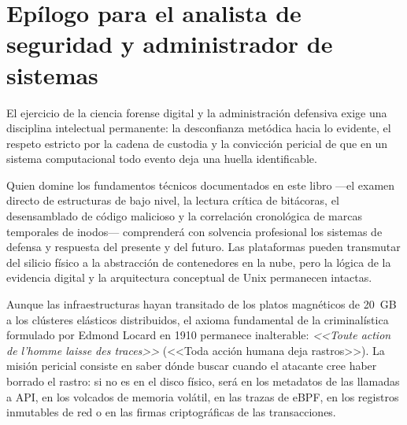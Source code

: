 \section{Epílogo para el analista de seguridad y administrador de sistemas}

El ejercicio de la ciencia forense digital y la administración defensiva exige una disciplina intelectual permanente: la desconfianza metódica hacia lo evidente, el respeto estricto por la cadena de custodia y la convicción pericial de que en un sistema computacional todo evento deja una huella identificable.

Quien domine los fundamentos técnicos documentados en este libro ---el examen directo de estructuras de bajo nivel, la lectura crítica de bitácoras, el desensamblado de código malicioso y la correlación cronológica de marcas temporales de inodos--- comprenderá con solvencia profesional los sistemas de defensa y respuesta del presente y del futuro. Las plataformas pueden transmutar del silicio físico a la abstracción de contenedores en la nube, pero la lógica de la evidencia digital y la arquitectura conceptual de Unix permanecen intactas.

\begin{notaforense}
Aunque las infraestructuras hayan transitado de los platos magnéticos de 20~GB a los clústeres elásticos distribuidos, el axioma fundamental de la criminalística formulado por Edmond Locard en 1910 permanece inalterable: \textit{<<Toute action de l'homme laisse des traces>>} (<<Toda acción humana deja rastros>>). La misión pericial consiste en saber dónde buscar cuando el atacante cree haber borrado el rastro: si no es en el disco físico, será en los metadatos de las llamadas a API, en los volcados de memoria volátil, en las trazas de eBPF, en los registros inmutables de red o en las firmas criptográficas de las transacciones.
\end{notaforense}
